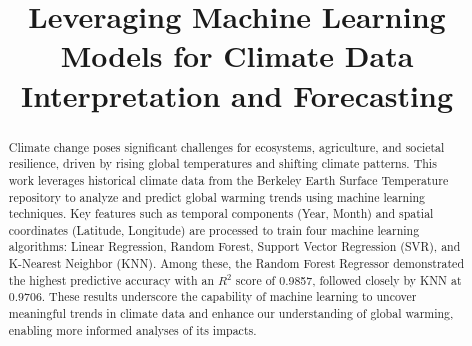 \documentclass[conference]{IEEEtran}
\begin{document}
\title{Leveraging Machine Learning Models for Climate Data Interpretation and Forecasting\\
}

\author{
\and
{}
\and
{}
\and
{}
}


\maketitle

\begin{abstract}
Climate change poses significant challenges for ecosystems, agriculture, and societal resilience, driven by rising global temperatures and shifting climate patterns. This work leverages historical climate data from the Berkeley Earth Surface Temperature repository to analyze and predict global warming trends using machine learning techniques. Key features such as temporal components (Year, Month) and spatial coordinates (Latitude, Longitude) are processed to train four machine learning algorithms: Linear Regression, Random Forest, Support Vector Regression (SVR), and K-Nearest Neighbor (KNN). Among these, the Random Forest Regressor demonstrated the highest predictive accuracy with an \(R^2\) score of 0.9857, followed closely by KNN at 0.9706. These results underscore the capability of machine learning to uncover meaningful trends in climate data and enhance our understanding of global warming, enabling more informed analyses of its impacts.
\end{abstract}
\end{document}
